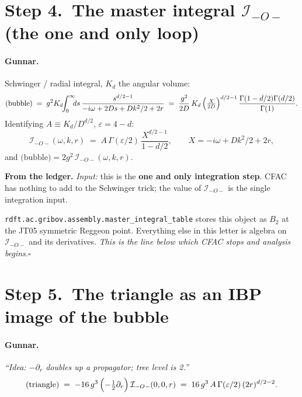 \documentclass[11pt,a4paper]{article}
\begin{document}
\section*{Step 4.\ The master integral $\mathcal I_{-O-}$ (the one and only loop)}

\paragraph{Gunnar.} Schwinger / radial integral, $K_{d}$ the angular volume:
\[
\text{(bubble)}
\;=\; g^{2} K_{d}\!\!\int_{0}^{\infty}\!\!\!ds\,\frac{s^{d/2-1}}{-i\omega+2Ds+Dk^{2}/2+2r}
\;=\; \frac{g^{2}}{2D}\,K_{d}\,\Bigl(\tfrac{X}{2D}\Bigr)^{d/2-1}\,\frac{\Gamma(1-d/2)\Gamma(d/2)}{\Gamma(1)}.
\]
Identifying $A \equiv K_{d}/D^{d/2}$, $\varepsilon = 4-d$:
\[
\boxed{\;\mathcal I_{-O-}(\omega,k,r)
\;=\; A\,\Gamma(\varepsilon/2)\,\frac{X^{d/2-1}}{1-d/2},
\qquad X = -i\omega + Dk^{2}/2 + 2r,\;}
\]
and $\text{(bubble)} = 2g^{2}\,\mathcal I_{-O-}(\omega,k,r)$.

\begin{cfacbox}
\textbf{From the ledger.} \emph{Input:} this is the \textbf{one and only integration
step}. CFAC has nothing to add to the Schwinger trick; the value of $\mathcal I_{-O-}$ is
the single integration input.

\medskip
\texttt{rdft.ac.gribov.assembly.master\_integral\_table} stores this object as $B_{2}$ at
the JT05 symmetric Reggeon point. Everything else in this letter is algebra on
$\mathcal I_{-O-}$ and its derivatives. \emph{This is the line below which CFAC stops
and analysis begins.}\hfill$\square$
\end{cfacbox}

\section*{Step 5.\ The triangle as an IBP image of the bubble}

\paragraph{Gunnar.} \emph{``Idea: $-\partial_{r}$ doubles up a propagator; tree level is
2.''}
\[
\text{(triangle)} \;=\; -16\,g^{3}\,\Bigl(-\tfrac{1}{2}\partial_{r}\Bigr)\,\mathcal I_{-O-}(0,0,r)
\;=\; 16\,g^{3}\,A\,\Gamma(\varepsilon/2)\,(2r)^{d/2-2}.
\]
\end{document}
